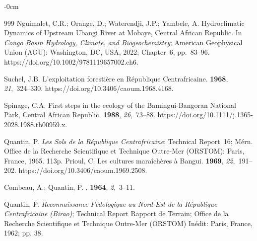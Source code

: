 \documentclass[minerals,article,accept,pdftex,moreauthors]{Definitions/mdpi}
\begin{document}
\begin{adjustwidth}{-\extralength}{0cm}
\begin{thebibliography}{999}
Nguimalet, C.R.; Orange, D.; Waterendji, J.P.; Yambele, A. Hydroclimatic
  Dynamics of Upstream Ubangi River at Mobaye, Central African Republic.
\newblock In {\em Congo Basin Hydrology, Climate, and Biogeochemistry};
  American Geophysical Union (AGU): Washington, DC, USA, 2022; Chapter~6, pp.~83--96. %
\newblock https://doi.org/10.1002/9781119657002.ch6.

Suchel, J.B.
\newblock L'exploitation forestière en République Centrafricaine.
 {\bf 1968}, {\em 21},~324--330.
\newblock https://doi.org/10.3406/\linebreak caoum.1968.4168.

Spinage, C.A.
\newblock First steps in the ecology of the Bamingui-Bangoran National Park,
  Central African Republic.
 {\bf 1988}, {\em 26},~73--88.
\newblock https://doi.org/10.1111/j.1365-2028.1988.tb00959.x.


Quantin, P.
\newblock \emph{Les Sols de la République Centrafricaine};
\newblock Technical Report~16; Mérn. Office de la Recherche Scientifique et
  Technique Outre-Mer (ORSTOM): Paris, France,  1965.
\newblock 113p. %
Prioul, C.
\newblock Les cultures maraîchères à Bangui.
 {\bf 1969}, {\em 22},~191--202.
\newblock https://doi.org/10.3406/caoum.1969.2508.

Combeau, A.; Quantin, P.
.
 {\bf 1964}, {\em 2},~3--11.

Quantin, P.
\newblock \emph{Reconnaissance Pédologique au Nord-Est de la République
  Centrafricaine (Birao)};
\newblock Technical Report {Rapport de Terrain}; Office de la Recherche
  Scientifique et Technique Outre-Mer (ORSTOM) Inédit: Paris, France,  1962;
\newblock  pp. 38. %



\end{thebibliography}
\end{adjustwidth}
\end{document}
